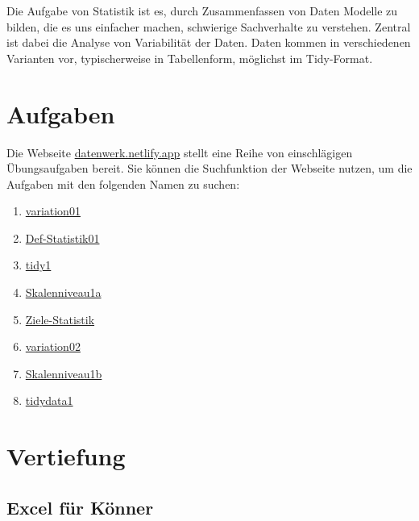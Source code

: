 \documentclass[
  letterpaper,
  oneside,
  open=any]{scrbook}
\providecommand{\tightlist}{%
  \setlength{\itemsep}{0pt}\setlength{\parskip}{0pt}}\usepackage{longtable,booktabs,array}
\theoremstyle{definition}
\theoremstyle{definition}
\theoremstyle{definition}
\theoremstyle{remark}
\begin{document}
Die Aufgabe von Statistik ist es, durch Zusammenfassen von Daten Modelle
zu bilden, die es uns einfacher machen, schwierige Sachverhalte zu
verstehen. Zentral ist dabei die Analyse von Variabilität der Daten.
Daten kommen in verschiedenen Varianten vor, typischerweise in
Tabellenform, möglichst im Tidy-Format.

\section{Aufgaben}\label{aufgaben}

Die Webseite \href{https://datenwerk.netlify.app}{datenwerk.netlify.app}
stellt eine Reihe von einschlägigen Übungsaufgaben bereit. Sie können
die Suchfunktion der Webseite nutzen, um die Aufgaben mit den folgenden
Namen zu suchen:

\begin{enumerate}
\def\labelenumi{\arabic{enumi}.}
\tightlist
\item
  \href{https://sebastiansauer.github.io/Datenwerk/posts/variation01/variation01.html}{variation01}
\item
  \href{https://sebastiansauer.github.io/Datenwerk/posts/def-statistik01/def-statistik01}{Def-Statistik01}
\item
  \href{https://sebastiansauer.github.io/Datenwerk/posts/tidy1/tidy1.html}{tidy1}
\item
  \href{https://sebastiansauer.github.io/Datenwerk/posts/skalenniveau1a/skalenniveau1a}{Skalenniveau1a}
\item
  \href{https://sebastiansauer.github.io/Datenwerk/posts/ziele-statistik/ziele-statistik}{Ziele-Statistik}
\item
  \href{https://sebastiansauer.github.io/Datenwerk/posts/variation02/variation02.html}{variation02}
\item
  \href{https://sebastiansauer.github.io/Datenwerk/posts/skalenniveau1b/skalenniveau1b}{Skalenniveau1b}
\item
  \href{https://sebastiansauer.github.io/Datenwerk/posts/tidydata1/tidydata1.html}{tidydata1}
\end{enumerate}

\section{Vertiefung}\label{vertiefung}

\subsection{Excel für Könner}\label{excel-fuxfcr-kuxf6nner}
\end{document}
